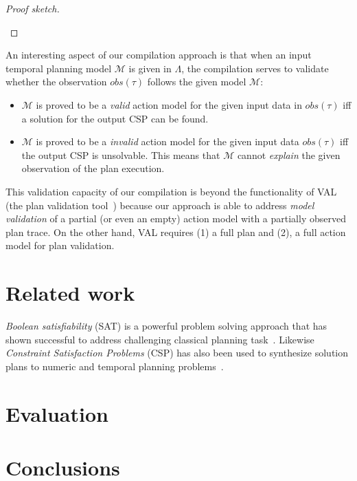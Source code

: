 \documentclass[letterpaper]{article} %
\begin{document}
\begin{proof}[Proof sketch]
\begin{small}
\end{small}
\end{proof}

An interesting aspect of our compilation approach is that when an input temporal planning model $\mathcal{M}$ is given in $\Lambda$, the compilation serves to validate whether the observation $obs(\tau)$ follows the given model $\mathcal{M}$:

\begin{itemize}
	\item $\mathcal{M}$ is proved to be a {\em valid} action model for the given input data in $obs(\tau)$ iff a solution for the output CSP can be found.
	\item $\mathcal{M}$ is proved to be a {\em invalid} action model for the given input data $obs(\tau)$ iff the output CSP is unsolvable. This means that $\mathcal{M}$ cannot {\em explain} the given observation of the plan execution.
\end{itemize}

This validation capacity of our compilation is beyond the functionality of VAL (the plan validation tool~\cite{howey2004val}) because our approach is able to address {\em model validation} of a partial (or even an empty) action model with a partially observed plan trace. On the other hand, VAL requires (1) a full plan and (2), a full action model for plan validation.

\section{Related work}
\label{sec:related}
{\em Boolean satisfiability} (SAT) is a powerful problem solving approach that has shown successful to address challenging classical planning task~\cite{kautz1999unifying,rintanen2009planning,rintanen2012planning}. Likewise {\em Constraint Satisfaction Problems} (CSP) has also been used to synthesize solution plans to numeric and temporal planning problems~\cite{do2001planning,lopez2003generalizing,vidal2006branching,garrido2009constraint}. 


\section{Evaluation}
\label{sec:evaluation}

\section{Conclusions}
\label{sec:conclusions}





\end{document}
